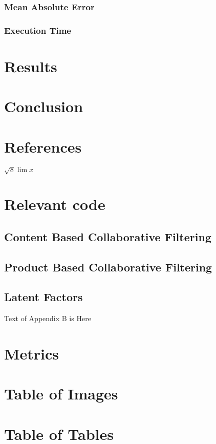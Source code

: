 \documentclass{article}
\begin{document}
\subsubsection{Mean Absolute Error}
\subsubsection{Execution Time}
\cite{ApacheSpark:1}
\cite{RecommenderSystems:2}
\cite{MovieLens:3}

\section{Results}
\section{Conclusion}
\newpage
\section{References}



$\sqrt{8} \lim{x}$
\newpage
\appendix
\section{Relevant code}
\subsection{Content Based Collaborative Filtering}
\subsection{Product Based Collaborative Filtering}
\subsection{Latent Factors}

Text of Appendix B is Here

\section{Metrics}
\section{Table of Images}
\section{Table of Tables}
\end{document}
